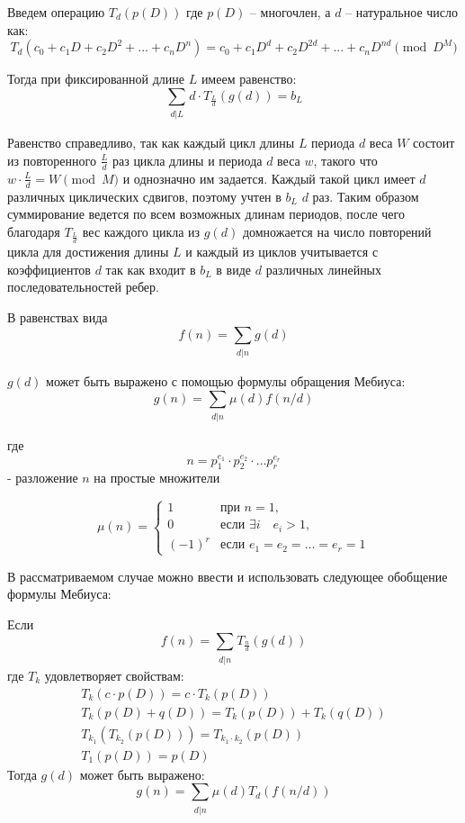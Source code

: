 \documentclass[specification,annotation,times]{itmo-student-thesis}
\begin{document}
\begin{definition} \label{def1}
Введем операцию $T_d(p(D))$ где $p(D)$ -- многочлен, а $d$ -- натуральное число как:
\[
  T_d(c_0+c_1D+c_2D^2+...+c_nD^n) = c_0+c_1D^{d}+c_2D^{2d}+...+c_nD^{nd} \pmod{D^M}
\]
\end{definition}

Тогда при фиксированной длине $L$ имеем равенство:
\[
  \sum_{\substack{d | L}}d \cdot T_{\frac{L}{d}}(g(d)) = b_L \label{eqWithT}
\]

Равенство справедливо, так как каждый цикл длины $L$ периода $d$ веса $W$ состоит из повторенного $\frac{L}{d}$ раз
цикла длины и периода $d$ веса $w$, такого что $w\cdot \frac{L}{d} = W \pmod M$ и однозначно им задается.
Каждый такой цикл имеет $d$ различных циклических сдвигов, поэтому учтен в $b_L$ $d$ раз.
Таким образом суммирование ведется по всем возможных длинам периодов, после чего благодаря $T_{\frac{L}{d}}$
вес каждого цикла из $g(d)$ домножается на число повторений цикла для достижения длины $L$ и каждый
из циклов учитывается с коэффициентов $d$ так как входит в $b_L$ в виде $d$ различных линейных 
последовательностей ребер.

В равенствах вида
\[
  f(n)=\sum_{\substack{d|n}}g(d)
\]

$g(d)$ может быть выражено с помощью формулы обращения Мебиуса:
\[
  g(n) = \sum_{\substack{d|n}}\mu(d)f(n/d)
\]

где\[
  n = p_1^{e_1} \cdot p_2^{e_2} \cdot \ldots p_r^{e_r}
\]
- разложение $n$ на простые множители

\[
  \mu(n)=
\left\{
  \begin{array}{lll}
    1 & \mbox{при } n=1, \\
    0 & \mbox{если } \exists i \quad e_i > 1, \\
    (-1)^r & \mbox{если } e_1 = e_2 = \ldots = e_r = 1
  \end{array}
\right.
\]

В рассматриваемом случае можно ввести и использовать следующее обобщение формулы Мебиуса:

\begin{theorem} \label{th1}
Если
\[
  f(n) = \sum_{\substack{d|n}}T_{\frac{n}{d}}(g(d))
\]
где $T_{k}$ удовлетворяет свойствам:
\begin{eqnarray}
T_k(c \cdot p(D)) = c \cdot T_k(p(D)) \label{eq1}\\
T_k(p(D)+q(D)) = T_k(p(D))+T_k(q(D))\label{eq2}\\
T_{k_1}(T_{k_2}(p(D))) = T_{k_1\cdot k_2}(p(D)) \label{eq3}\\
T_1(p(D)) = p(D) \label{eq4}\
\end{eqnarray}
Тогда $g(d)$ может быть выражено:
\[
  g(n) = \sum_{\substack{d|n}}\mu(d)T_d(f(n/d))
\]
\end{theorem}
\end{document}
